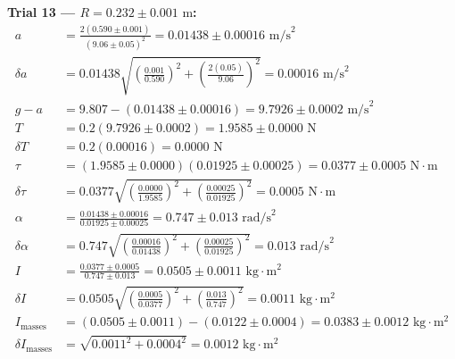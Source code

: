 \documentclass[11pt]{article}
\begin{document}
\textbf{Trial 13 — $R = 0.232 \pm 0.001\text{ m}$:}
\begin{align*}
a &= \frac{2(0.590 \pm 0.001)}{(9.06 \pm 0.05)^2} = 0.01438 \pm 0.00016\text{ m/s}^2 \\
\delta a &= 0.01438\sqrt{\left(\frac{0.001}{0.590}\right)^2 + \left(\frac{2(0.05)}{9.06}\right)^2} = 0.00016\text{ m/s}^2 \\
g - a &= 9.807 - (0.01438 \pm 0.00016) = 9.7926 \pm 0.0002\text{ m/s}^2 \\
T &= 0.2(9.7926 \pm 0.0002) = 1.9585 \pm 0.0000\text{ N} \\
\delta T &= 0.2(0.00016) = 0.0000\text{ N} \\
\tau &= (1.9585 \pm 0.0000)(0.01925 \pm 0.00025) = 0.0377 \pm 0.0005\text{ N}\cdot\text{m} \\
\delta\tau &= 0.0377\sqrt{\left(\frac{0.0000}{1.9585}\right)^2 + \left(\frac{0.00025}{0.01925}\right)^2} = 0.0005\text{ N}\cdot\text{m} \\
\alpha &= \frac{0.01438 \pm 0.00016}{0.01925 \pm 0.00025} = 0.747 \pm 0.013\text{ rad/s}^2 \\
\delta\alpha &= 0.747\sqrt{\left(\frac{0.00016}{0.01438}\right)^2 + \left(\frac{0.00025}{0.01925}\right)^2} = 0.013\text{ rad/s}^2 \\
I &= \frac{0.0377 \pm 0.0005}{0.747 \pm 0.013} = 0.0505 \pm 0.0011\text{ kg}\cdot\text{m}^2 \\
\delta I &= 0.0505\sqrt{\left(\frac{0.0005}{0.0377}\right)^2 + \left(\frac{0.013}{0.747}\right)^2} = 0.0011\text{ kg}\cdot\text{m}^2 \\
I_{\text{masses}} &= (0.0505 \pm 0.0011) - (0.0122 \pm 0.0004) = 0.0383 \pm 0.0012\text{ kg}\cdot\text{m}^2 \\
\delta I_{\text{masses}} &= \sqrt{0.0011^2 + 0.0004^2} = 0.0012\text{ kg}\cdot\text{m}^2
\end{align*}
\end{document}

